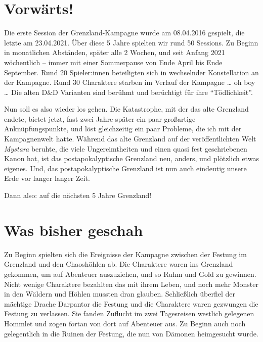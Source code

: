 \documentclass[11pt]{wbzine}
\begin{document}
\begin{multicols}{2}

\section{Vorwärts!}

Die erste Session der Grenzland-Kampagne wurde am 08.04.2016
    gespielt, die letzte am 23.04.2021. Über diese 5 Jahre spielten
    wir rund 50 Sessions. Zu Beginn in monatlichen Abständen, später
    alle 2 Wochen, und seit Anfang 2021 wöchentlich – immer mit
    einer Sommerpause von Ende April bis Ende September. Rund 20
    Spieler:innen beteiligten sich in wechselnder Konstellation an
    der Kampagne. Rund 30 Charaktere starben im Verlauf der Kampagne
    … oh boy … Die alten D\&D Varianten sind berühmt und berüchtigt
    für ihre ``Tödlichkeit''.

Nun soll es also wieder los gehen. Die Katastrophe, mit der das alte
    Grenzland endete, bietet jetzt, fast zwei Jahre später ein paar
    großartige Anknüpfungspunkte, und löst gleichzeitig ein paar
    Probleme, die ich mit der Kampagnenwelt hatte. Während das alte
    Grenzland auf der veröffentlichten Welt \textit{Mystara}
    beruhte, die viele Ungereimtheiten und einen quasi fest
    geschriebenen Kanon hat, ist das postapokalyptische Grenzland
    neu, anders, und plötzlich etwas eigenes. Und, das
    postapokalyptische Grenzland ist nun auch eindeutig unsere Erde
    vor langer langer Zeit. 


Dann also: auf die nächsten 5 Jahre Grenzland!


\section{Was bisher geschah}

Zu Beginn spielten sich die Ereignisse der Kampagne zwischen der
    Festung im Grenzland und den Chaoshöhlen ab. Die Charaktere
    waren ins Grenzland gekommen, um auf Abenteuer auszuziehen, und
    so Ruhm und Gold zu gewinnen. Nicht wenige Charaktere bezahlten
    das mit ihrem Leben, und noch mehr Monster in den Wäldern und
    Höhlen mussten dran glauben. Schließlich überfiel der mächtige
    Drache Darpantor die Festung und die Charaktere waren gezwungen
    die Festung zu verlassen. Sie fanden Zuflucht im zwei
    Tagesreisen westlich gelegenen Hommlet und zogen fortan von dort
    auf Abenteuer aus. Zu Beginn auch noch gelegentlich in die
    Ruinen der Festung, die nun von Dämonen heimgesucht wurde.


\end{multicols}
\end{document}
